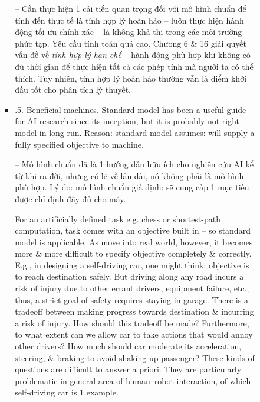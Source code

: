 \documentclass{article}
\begin{document}
\begin{itemize}
\begin{itemize}
\begin{itemize}
\begin{itemize}
				-- Cần thực hiện 1 cải tiến quan trọng đối với mô hình chuẩn để tính đến thực tế là tính hợp lý hoàn hảo -- luôn thực hiện hành động tối ưu chính xác -- là không khả thi trong các môi trường phức tạp. Yêu cầu tính toán quá cao. Chương 6 \& 16 giải quyết vấn đề về {\it tính hợp lý hạn chế} -- hành động phù hợp khi không có đủ thời gian để thực hiện tất cả các phép tính mà người ta có thể thích. Tuy nhiên, tính hợp lý hoàn hảo thường vẫn là điểm khởi đầu tốt cho phân tích lý thuyết.
				\item {.5. Beneficial machines.} Standard model has been a useful guide for AI research since its inception, but it is probably not right model in long run. Reason: standard model assumes: will supply a fully specified objective to machine.

				-- Mô hình chuẩn đã là 1 hướng dẫn hữu ích cho nghiên cứu AI kể từ khi ra đời, nhưng có lẽ về lâu dài, nó không phải là mô hình phù hợp. Lý do: mô hình chuẩn giả định: sẽ cung cấp 1 mục tiêu được chỉ định đầy đủ cho máy.

				For an artificially defined task e.g. chess or shortest-path computation, task comes with an objective built in -- so standard model is applicable. As move into real world, however, it becomes more \& more difficult to specify objective completely \& correctly. E.g., in designing a self-driving car, one might think: objective is to reach destination safely. But driving along any road incurs a risk of injury due to other errant drivers, equipment failure, etc.; thus, a strict goal of safety requires staying in garage. There is a tradeoff between making progress towards destination \& incurring a risk of injury. How should this tradeoff be made? Furthermore, to what extent can we allow car to take actions that would annoy other drivers? How much should car moderate its acceleration, steering, \& braking to avoid shaking up passenger? These kinds of questions are difficult to answer a priori. They are particularly problematic in general area of human--robot interaction, of which self-driving car is 1 example.


\end{itemize}
\end{itemize}
\end{itemize}
\end{itemize}
\end{document}
